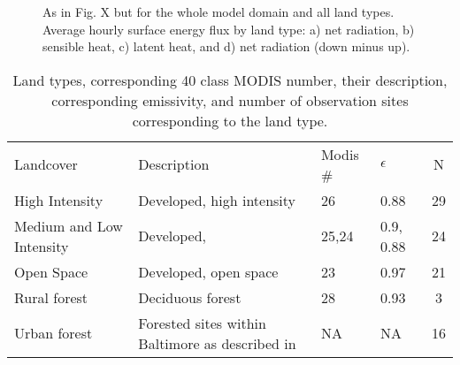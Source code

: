 \begin{figure}[h]
\centering
\caption{As in Fig. X but for the whole model domain and all land types. Average hourly surface energy flux by land type: a) net radiation, b) sensible heat, c) latent heat, and d) net radiation (down minus up).}
\label{fig:seb_wd}
\end{figure}

%
\begin{table}
\centering
\begin{tabular}{l l l l c}
Landcover & Description &  Modis \# & $\epsilon$ & N  \\
High Intensity & Developed, high intensity & 26& 0.88 & 29 \\
Medium and Low Intensity & Developed, & 25,24& 0.9, 0.88 & 24\\
Open Space& Developed, open space &23 & 0.97 &  21\\
Rural forest&Deciduous forest & 28& 0.93& 3\\
Urban forest& Forested sites within Baltimore as described in \cite{} &NA & NA & 16\\
\end{tabular}
\caption{Land types, corresponding 40 class MODIS number, their description, corresponding emissivity, and number of observation sites corresponding to the land type.}
\label{tab:lcc}
\end{table}


